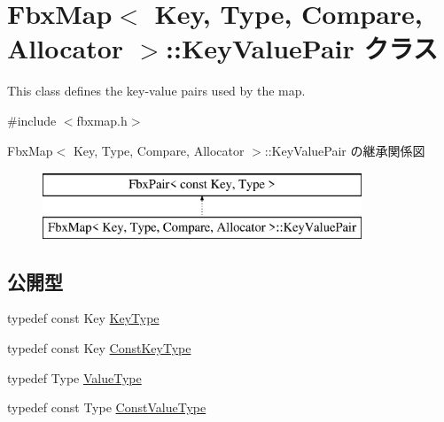\hypertarget{class_fbx_map_1_1_key_value_pair}{}\section{Fbx\+Map$<$ Key, Type, Compare, Allocator $>$\+:\+:Key\+Value\+Pair クラス}
\label{class_fbx_map_1_1_key_value_pair}


This class defines the key-\/value pairs used by the map.  




{\ttfamily \#include $<$fbxmap.\+h$>$}

Fbx\+Map$<$ Key, Type, Compare, Allocator $>$\+:\+:Key\+Value\+Pair の継承関係図\begin{figure}[H]
\begin{center}
\leavevmode
\includegraphics[height=2.000000cm]{class_fbx_map_1_1_key_value_pair}
\end{center}
\end{figure}
\subsection*{公開型}
\begin{DoxyCompactItemize}
\item 
typedef const Key \hyperlink{class_fbx_map_1_1_key_value_pair_a5e685c6ff77cdf31f878e5105737c1a3}{Key\+Type}
\item 
typedef const Key \hyperlink{class_fbx_map_1_1_key_value_pair_a74738485dc0b74e76e09dfbcdca9e62e}{Const\+Key\+Type}
\item 
typedef Type \hyperlink{class_fbx_map_1_1_key_value_pair_a716c83c1f6dabf173132b5acde84a9fe}{Value\+Type}
\item 
typedef const Type \hyperlink{class_fbx_map_1_1_key_value_pair_a13d0030dcec9979f30273cc4ac6ed871}{Const\+Value\+Type}
\end{DoxyCompactItemize}
